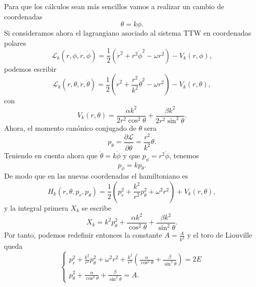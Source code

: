 \documentclass[12pt,a4paper,twoside]{article}
\theoremstyle{definition} \newtheorem{defn}[thm]{Definición}
\theoremstyle{definition} \newtheorem{ejemplo}[thm]{Ejemplo}
\theoremstyle{definition} \newtheorem{ejercicio}[thm]{Ejercicio}
\theoremstyle{remark} \newtheorem*{obs}{Observación}
\begin{document}
Para que los cálculos sean más sencillos vamos a realizar un cambio de coordenadas 
\begin{equation}
 \theta=k\phi. 
\end{equation}
Si consideramos ahora el lagrangiano asociado al sistema TTW en coordenadas polares
\begin{equation}
  \mathcal{L} _k(r,\phi,\dot{r},\dot{\phi})=\frac{1}{2}\left(\dot{r}^2+r^2\dot{\phi}^2-\omega r^2\right)-V_k(r,\phi), 
\end{equation}
podemos escribir
\begin{equation}
  \mathcal{L} _k(r,\theta,\dot{r},\dot{\theta})=\frac{1}{2}\left(\dot{r}^2+\frac{r^2}{k^2}\dot{\theta}^2-\omega r^2\right)-V_k(r,\theta), 
\end{equation}
con
\begin{equation}
  V_k(r,\theta)=\frac{\alpha k^2}{2r^2\cos^2 \theta}+\frac{\beta k^2}{2r^2\sin^2 \theta}.
\end{equation}
Ahora, el momento canónico conjugado de $\theta$ sera
\begin{equation}
  p_\theta=\frac{\partial \mathcal{L} }{\partial \dot{\theta}}=\frac{r^2}{k^2}\dot{\theta}. 
\end{equation}
Teniendo en cuenta ahora que $\dot{\theta}=k\dot{\phi}$ y que $p_{\phi}=r^2\dot{\phi}$, tenemos
\begin{equation}
  p_{\phi}=kp_\theta. 
\end{equation}
De modo que en las nuevas coordenadas el hamiltoniano es
\begin{equation}
  H_k(r,\theta,p_r,p_{\theta})=\frac{1}{2}\left( p_r^2+\frac{k^2}{r^2}p^2_{\theta} +\omega^2 r^2 \right) + V_k(r,\theta),
\end{equation}
y la integral primera $X_k$ se escribe
\begin{equation}
  X_k=k^2p_{\theta}^2+\frac{\alpha k^2}{\cos^2 \theta}+\frac{\beta k^2}{\sin^2 \theta}.
\end{equation}
Por tanto, podemos redefinir entonces la constante $A=\frac{A}{k^2}$ y el toro de Liouville queda
\begin{equation}
  \begin{cases}
    p_r^2+\frac{k^2}{r^2}p_{\theta}^2+\omega^2r^2 + \frac{k^2}{r^2}\left( \frac{\alpha}{\cos^2\theta} +\frac{\beta}{\sin^2\theta}\right) = 2E \\
    p_{\theta}^2+ \frac{\alpha}{\cos^2\theta} +\frac{\beta}{\sin^2\theta}=A.
  \end{cases}
  \label{eq:toro}
\end{equation}
\end{document}
